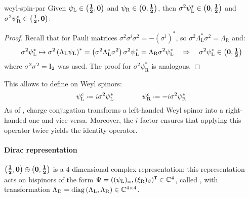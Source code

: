 \begin{proposition}{}{weyl-spin-par}
  Given $ \psi_\text{L} \in \mathbf{\left( \frac{1}{2},0 \right)} $ and $ \psi_\text{R} \in \mathbf{\left( 0,\frac{1}{2} \right)} $, then $ \sigma^2 \psi_\text{L}^* \in \mathbf{\left( 0,\frac{1}{2} \right)} $ and $ \sigma^2 \psi_\text{R}^* \in \mathbf{\left( \frac{1}{2},0 \right)} $.
\end{proposition}

\begin{proofbox}
  \begin{proof}
    Recall that for Pauli matrices $ \sigma^2 \sigma^i \sigma^2 = -(\sigma^i)^* $, so $ \sigma^2 \Lambda_\text{L}^* \sigma^2 = \Lambda_\text{R} $ and:
    \begin{equation*}
      \sigma^2 \psi_\text{L}^* \mapsto \sigma^2 \left( \Lambda_\text{L} \psi_\text{L} \right)^* = \left( \sigma^2 \Lambda_\text{L}^* \sigma^2 \right) \sigma^2 \psi_\text{L}^* = \Lambda_\text{R} \sigma^2 \psi_\text{L}^*
      \quad \Rightarrow \quad
      \sigma^2 \psi_\text{L}^* \in \mathbf{\left( 0,\tfrac{1}{2} \right)}
    \end{equation*}
    where $ \sigma^2 \sigma^2 = \mathrm{I}_2 $ was used. The proof for $ \sigma^2 \psi_\text{R}^* $ is analogous.
  \end{proof}
\end{proofbox}

This allows to define  on Weyl spinors:
\begin{equation}
  \psi_\text{L}^c \defeq i \sigma^2 \psi_\text{L}^*
  \qquad \qquad
  \psi_\text{R}^c \defeq -i \sigma^2 \psi_\text{R}^*
\end{equation}
As of , charge conjugation transforms a left-handed Weyl spinor into a right-handed one and vice versa. Moreover, the $ i $ factor ensures that applying this operator twice yields the identity operator.

\paragraph{Dirac representation}

$ \mathbf{\left( \frac{1}{2},0 \right)} \oplus \mathbf{\left( 0,\frac{1}{2} \right)} $ is a 4-dimensional complex representation: this representation acts on bispinors of the form $ \Psi = \left( (\psi_\text{L})_\alpha, (\xi_\text{R})_\beta \right)^\intercal \in \mathbb{C}^4 $, called , with transformation $ \Lambda_\text{D} = \operatorname{diag} \left( \Lambda_\text{L}, \Lambda_\text{R} \right) \in \mathbb{C}^{4 \times 4} $.

